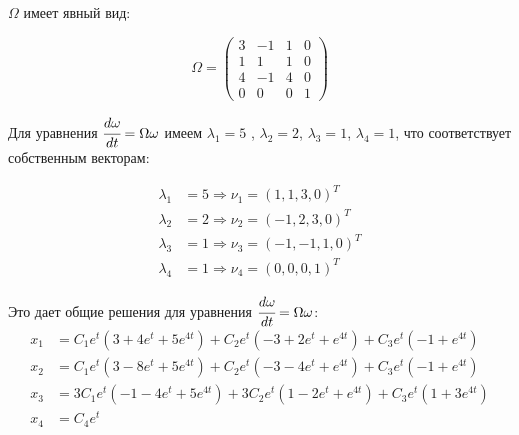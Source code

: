 \documentclass[a4paper,12pt]{article}
\begin{document}
    $\Omega$ имеет явный вид:

    \begin{equation}
        \Omega = \begin{pmatrix}
            3 & -1 & 1 & 0 \\
            1 & 1 & 1 & 0 \\
            4 & -1 & 4 & 0 \\
            0 & 0 & 0 & 1
        \end{pmatrix}
    \end{equation}

    Для уравнения $\cfrac{d\omega}{dt} = \Omega \omega$ имеем $\lambda_1 = 5$ , $\lambda_2 = 2$, $\lambda_3 = 1$, $\lambda_4 = 1$, что соответствует собственным векторам:

    \begin{align*}
        \lambda_1 &= 5 \Rightarrow \nu_1 = (1, 1, 3, 0)^T \\
        \lambda_2 &= 2 \Rightarrow \nu_2 = (-1, 2, 3, 0)^T \\
        \lambda_3 &= 1 \Rightarrow \nu_3 = (-1, -1, 1, 0)^T \\
        \lambda_4 &= 1 \Rightarrow \nu_4 = (0, 0, 0, 1)^T
    \end{align*}
    
    Это дает общие решения для уравнения $\cfrac{d\omega}{dt} = \Omega \omega$:
    \begin{equation}
        \label{eq:x_general}
        \begin{aligned}
            x_1 &= C_1 e^t \left(3 + 4 e^t + 5 e^{4t}\right) + C_2 e^t \left(-3 + 2e^t + e^{4t} \right) + C_3 e^t \left(-1 + e^{4t} \right) \\
            x_2 &= C_1 e^t \left(3 - 8e^t + 5e^{4t}\right) + C_2 e^t \left(-3 - 4e^t + e^{4t} \right) + C_3 e^t \left(-1 + e^{4t} \right) \\
            x_3 &= 3C_1 e^t \left(-1 - 4e^t + 5e^{4t} \right) + 3C_2 e^t \left( 1 - 2e^t + e^{4t} \right) + C_3 e^t \left( 1 + 3e^{4t} \right) \\
            x_4 &= C_4 e^t
        \end{aligned}
    \end{equation}
\end{document}
